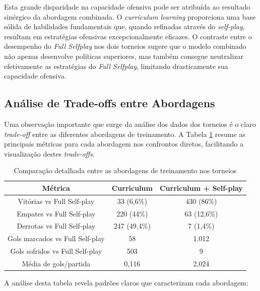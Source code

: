 Esta grande disparidade na capacidade ofensiva pode ser atribuída ao resultado sinérgico da abordagem combinada. O \textit{curriculum learning} proporciona uma base sólida de habilidades fundamentais que, quando refinadas através do \textit{self-play}, resultam em estratégias ofensivas excepcionalmente eficazes. O contraste entre o desempenho do \textit{Full Selfplay} nos dois torneios sugere que o modelo combinado não apenas desenvolve políticas superiores, mas também consegue neutralizar efetivamente as estratégias do \textit{Full Selfplay}, limitando drasticamente sua capacidade ofensiva.

\subsection{Análise de Trade-offs entre Abordagens}

Uma observação importante que surge da análise dos dados dos torneios é o claro \textit{trade-off} entre as diferentes abordagens de treinamento. A Tabela \ref{tab:comparacao_abordagens_detalhada} resume as principais métricas para cada abordagem nos confrontos diretos, facilitando a visualização destes \textit{trade-offs}.

\begin{table}[H]
    \centering
    \begin{tabular}{|c|c|c|}
        \hline
        \textbf{Métrica} & \textbf{Curriculum} & \textbf{Curriculum + Self-play} \\
        \hline
        Vitórias vs Full Self-play & 33 (6,6\%) & 430 (86\%) \\
        \hline
        Empates vs Full Self-play & 220 (44\%) & 63 (12,6\%) \\
        \hline
        Derrotas vs Full Self-play & 247 (49,4\%) & 7 (1,4\%) \\
        \hline
        Gols marcados vs Full Self-play & 58 & 1.012 \\
        \hline
        Gols sofridos vs Full Self-play & 503 & 9 \\
        \hline
        Média de gols/partida & 0,116 & 2,024 \\
        \hline
    \end{tabular}
    \caption{Comparação detalhada entre as abordagens de treinamento nos torneios}
    \label{tab:comparacao_abordagens_detalhada}
\end{table}

A análise desta tabela revela padrões claros que caracterizam cada abordagem:

